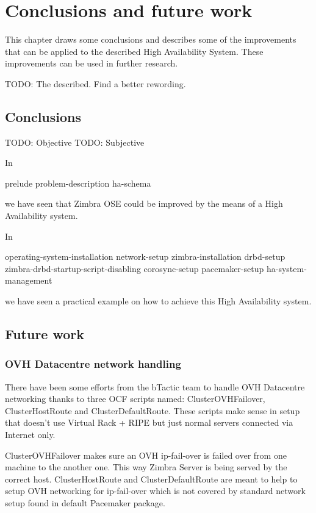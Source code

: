 

\chapter{Conclusions and future work}
\label{chap:conclusions-and-future-work}
This chapter draws some conclusions and describes some of the improvements that can be applied to the described High Availability System. These improvements can be used in further research.

TODO: The described. Find a better rewording.

\section {Conclusions}

TODO: Objective
TODO: Subjective

In 

{prelude}
{problem-description}
{ha-schema}

we have seen that Zimbra OSE could be improved by the means of a High Availability system.

In 

{operating-system-installation}
{network-setup}
{zimbra-installation}
{drbd-setup}
{zimbra-drbd-startup-script-disabling}
{corosync-setup}
{pacemaker-setup}
{ha-system-management}

we have seen a practical example on how to achieve this High Availability system.

\section {Future work}

\subsection {OVH Datacentre network handling}
There have been some efforts from the bTactic team to handle OVH Datacentre networking thanks to three OCF scripts named: 
ClusterOVHFailover, ClusterHostRoute and ClusterDefaultRoute. These scripts make sense in setup that doesn't use Virtual Rack + RIPE but just normal servers connected via Internet only.

ClusterOVHFailover makes sure an OVH ip-fail-over is failed over from one machine to the another one. This way Zimbra Server is being served by the correct host.
ClusterHostRoute and ClusterDefaultRoute are meant to help to setup OVH networking for ip-fail-over which is not covered by standard network setup found in  default Pacemaker package.

